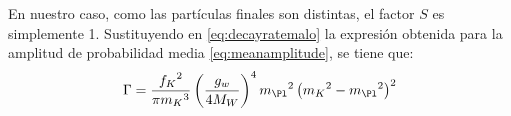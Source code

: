 En nuestro caso, como las partículas finales son distintas, el factor $S$ es simplemente 1. Sustituyendo en \ref{eq:decayratemalo} la expresión obtenida para la amplitud de probabilidad media \ref{eq:meanamplitude}, se tiene que:
\begin{equation}
\Gamma =\dfrac{{f_{K}}^{2}}{\pi {m_{K}}^{3}}\left( \dfrac{g_w}{4M_W}\right)^{4}{m_{\Pl}}^{2}\left({m_{K}}^{2}-{m_{\Pl}}^{2}\right)^{2}\label{eq:decayratebueno}
\end{equation}
